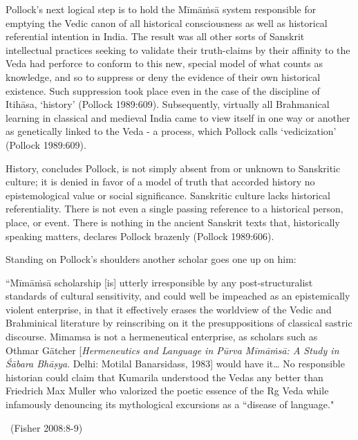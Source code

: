 Pollock’s next logical step is to hold the Mīmāṁsā system responsible for emptying the Vedic canon of all historical consciousness as well as historical referential intention in India. The result was all other sorts of Sanskrit intellectual practices seeking to validate their truth-claims by their affinity to the Veda had perforce to conform to this new, special model of what counts as knowledge, and so to suppress or deny the evidence of their own historical existence. Such suppression took place even in the case of the discipline of Itihāsa, ‘history’ (Pollock 1989:609). Subsequently, virtually all Brahmanical learning in classical and medieval India came to view itself in one way or another as genetically linked to the Veda - a process, which Pollock calls ‘vedicization’ (Pollock 1989:609).

History, concludes Pollock, is not simply absent from or unknown to Sanskritic culture; it is denied in favor of a model of truth that accorded history no epistemological value or social significance. Sanskritic culture lacks historical referentiality. There is not even a single passing reference to a historical person, place, or event. There is nothing in the ancient Sanskrit texts that, historically speaking matters, declares Pollock brazenly (Pollock 1989:606).

Standing on Pollock’s shoulders another scholar goes one up on him:

\begin{myquote}
“Mīmāṁsā scholarship [is] utterly irresponsible by any post-structuralist standards of cultural sensitivity, and could well be impeached as an epistemically violent enterprise, in that it effectively erases the worldview of the Vedic and Brahminical literature by reinscribing on it the presuppositions of classical sastric discourse. Mimamsa is not a hermeneutical enterprise, as scholars such as Othmar Gätcher [\textit{Hermeneutics and Language in Pūrva Mīmāṁsā: A Study in Śābara Bhāṣya}. Delhi: Motilal Banarsidass, 1983] would have it… No responsible historian could claim that Kumarila understood the Vedas any better than Friedrich Max Muller who valorized the poetic essence of the Rg Veda while infamously denouncing its mythological excursions as a “disease of language."

~\hfill (Fisher 2008:8-9)
\end{myquote}


